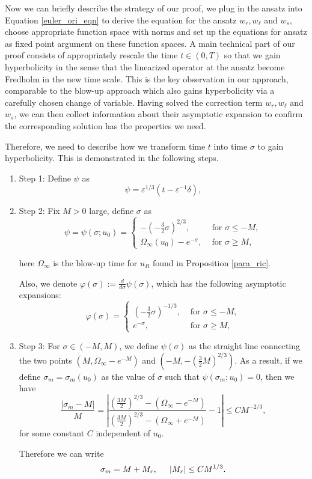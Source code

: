 \documentclass[letterpaper,11pt]{article}
\newcommand{\eps}{\varepsilon}
\numberwithin{equation}{section}
\theoremstyle{plain}
\begin{document}
Now we can briefly describe the strategy of our proof, we plug in the ansatz into Equation \eqref{euler_ori_eqn} to derive the equation for the ansatz $w_r, w_\ell $ and $w_s$, choose appropriate function space with norms and set up the equations for ansatz as fixed point argument on these function spaces. A main technical part of our proof consists of appropriately rescale the time $t \in (0,T)$ so that we gain hyperbolicity in the sense that the linearized operator at the ansatz become Fredholm in the new time scale. This is the key observation in our approach, comparable to the blow-up approach which also gains hyperbolicity via a carefully chosen change of variable. Having solved the correction term $w_r, w_\ell$ and $w_s$, we can then collect information about their asymptotic expansion to confirm the corresponding solution has the properties we need.


Therefore, we need to describe how we transform time $t$ into time $\sigma$ to gain hyperbolicity. This is demonstrated in the following steps.
\begin{enumerate}
\item Step 1: Define $\psi$ as
\[
\psi = \eps^{1/3}(t - \eps^{-1}\delta),
\]

\item Step 2:
Fix $M>0$ large, define $\sigma$ as
\begin{equation} \label{psi_def}
\psi = \psi(\sigma; u_0) =\begin{cases}
-(-\frac{3}{2} \sigma)^{2/3} , &\text{ for }\sigma \le -M, \\
\Omega_\infty(u_0) -e^{-\sigma}, &\text{ for }\sigma \ge M,
\end{cases}
\end{equation}

here $\Omega_\infty$ is the blow-up time for $u_R$ found in Proposition \ref{para_ric}.

Also, we denote $\varphi(\sigma) := \frac{d}{d\sigma}\psi(\sigma)$, which has the following asymptotic expansions: 
\begin{equation} \label{phi_def}
\varphi(\sigma)  =\begin{cases}
(-\frac{3}{2} \sigma)^{-1/3} , &\text{ for }\sigma \le -M, \\
e^{-\sigma}, &\text{ for }\sigma \ge M,
\end{cases}
\end{equation}
\item Step 3: For $\sigma \in (-M, M)$, we define $\psi(\sigma)$ as the straight line connecting the two points $(M, \Omega_\infty-e^{-M})$ and $(-M, -(\frac{3}{2}M)^{2/3})$. As a result, if we define $\sigma_m=\sigma_m(u_0)$ as the value of $\sigma$ such that $\psi(\sigma_m; u_0) = 0$, then we have 
\[
\frac{|\sigma_m - M|}{M} = \left| \frac{(\frac{3M}{2})^{2/3}-(\Omega_\infty-e^{-M})}{(\frac{3M}{2})^{2/3}-(\Omega_\infty+e^{-M})} -1 \right|\le CM^{-2/3},
\] 
for some constant $C$ independent of $u_0$.

Therefore we can write
\begin{equation}\label{sigm_asy}
\sigma_m = M + M_r, \hspace{0.2in} |M_r| \le CM^{1/3}.
\end{equation}
\end{enumerate}
\end{document}

